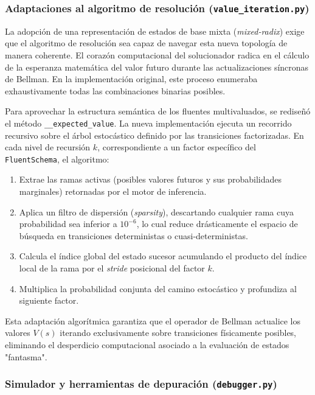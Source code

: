 \subsubsection{Adaptaciones al algoritmo de resolución (\texttt{value\_iteration.py})}
\label{sec:di-value-iteration}

La adopción de una representación de estados de base mixta (\textit{mixed-radix}) exige que el algoritmo de resolución sea capaz de navegar esta nueva topología de manera coherente. El corazón computacional del solucionador radica en el cálculo de la esperanza matemática del valor futuro durante las actualizaciones síncronas de Bellman. En la implementación original, este proceso enumeraba exhaustivamente todas las combinaciones binarias posibles.

Para aprovechar la estructura semántica de los fluentes multivaluados, se rediseñó el método \texttt{\_\_expected\_value}. La nueva implementación ejecuta un recorrido recursivo sobre el árbol estocástico definido por las transiciones factorizadas. En cada nivel de recursión $k$, correspondiente a un factor específico del \texttt{FluentSchema}, el algoritmo:
\begin{enumerate}
    \item Extrae las ramas activas (posibles valores futuros y sus probabilidades marginales) retornadas por el motor de inferencia.
    \item Aplica un filtro de dispersión (\textit{sparsity}), descartando cualquier rama cuya probabilidad sea inferior a $10^{-6}$, lo cual reduce drásticamente el espacio de búsqueda en transiciones deterministas o cuasi-deterministas.
    \item Calcula el índice global del estado sucesor acumulando el producto del índice local de la rama por el \textit{stride} posicional del factor $k$.
    \item Multiplica la probabilidad conjunta del camino estocástico y profundiza al siguiente factor.
\end{enumerate}

Esta adaptación algorítmica garantiza que el operador de Bellman actualice los valores $V(s)$ iterando exclusivamente sobre transiciones físicamente posibles, eliminando el desperdicio computacional asociado a la evaluación de estados "fantasma".

\subsubsection{Simulador y herramientas de depuración (\texttt{debugger.py})}
\label{sec:di-debugger}


